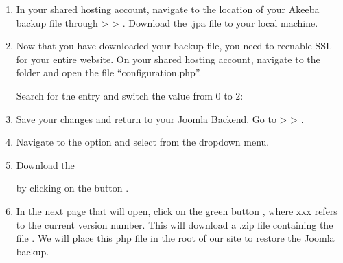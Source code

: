 \documentclass[a4paper,10pt,english,openany,oneside]{sphinxmanual}
\begin{document}
\begin{enumerate}
\item {} 
\sphinxAtStartPar
In your shared hosting account, navigate to the location of your Akeeba backup file through  >  > . Download the .jpa file to your local machine.

\item {} 
\sphinxAtStartPar
Now that you have downloaded your backup file, you need to re\sphinxhyphen{}enable SSL for your entire website. On your shared hosting account, navigate to the folder  and open the file “configuration.php”.

\sphinxAtStartPar
Search for the entry  and switch the value from 0 to 2:
\begin{quote}

\begin{sphinxVerbatim}[commandchars=\\\{\}]
\end{sphinxVerbatim}
\end{quote}

\item {} 
\sphinxAtStartPar
Save your changes and return to your Joomla Backend. Go to  >  > .

\item {} 
\sphinxAtStartPar
Navigate to the option  and select  from the drop\sphinxhyphen{}down menu.

\item {} 
\sphinxAtStartPar
Download the %
\begin{footnote}[8]\sphinxAtStartFootnote
{}
%
\end{footnote} by clicking on the button .

\item {} 
\sphinxAtStartPar
In the next page that will open, click on the green button , where xxx refers to the current version number. This will download a .zip file containing the file . We will place this php file in the root of our site to restore the Joomla backup.

\end{enumerate}
\end{document}
